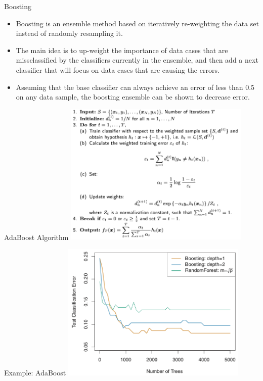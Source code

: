 \documentclass[serif,xcolor=pdftex,dvipsnames,table,hyperref={bookmarks=false,breaklinks}]{beamer}
\begin{document}
\begin{frame}[t]{Boosting}

\begin{itemize}
\setlength{\itemsep}{8pt}

\item Boosting is an ensemble method based on iteratively re-weighting the data set instead
of randomly resampling it.

\pause \item The main idea is to up-weight the importance of data cases that are missclassified by the classifiers currently in the ensemble, and then add a next classifier that will focus on data cases that are causing the errors.

\pause \item Assuming that the base classifier can always achieve an error of less than 0.5 on any data sample, the boosting ensemble can be shown to decrease error.

\end{itemize}

\end{frame}

\begin{frame}[t]{AdaBoost Algorithm}
\center
\includegraphics[width=3.5in]{../Figures/boosting_algorithm.png}
\end{frame}

\begin{frame}[t]{Example: AdaBoost}
\center
\includegraphics[width=3.5in]{../Figures/boosting_examples2.png}
\end{frame}
\end{document}
